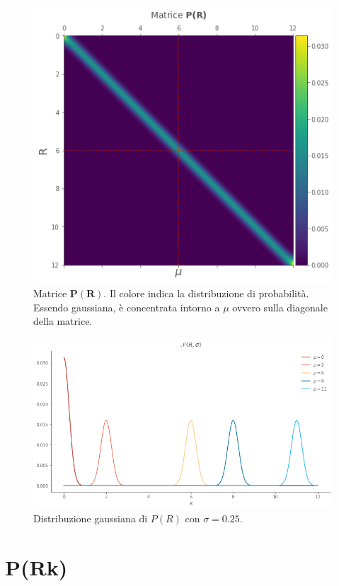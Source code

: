 \documentclass[11pt]{article}
\begin{document}
    
    
    \begin{figure}
    \centering
        \includegraphics{pr1.png}
        \caption{Matrice $\mathbf{P(R)}$. Il colore indica la distribuzione di probabilità. Essendo gaussiana, è concentrata intorno a $\mu$ ovvero sulla diagonale della matrice.}
        \label{fig:pr1}
    \end{figure}

    
    
    \begin{figure}
    \centering
        \includegraphics{pr2.png}
        \caption{Distribuzione gaussiana di $P(R)$ con $\sigma=0.25$.}
        \label{fig:pr2}
    \end{figure}

    
    \hypertarget{prk}{%
\section{P(R\textbar k)}\label{prk}}
\end{document}
